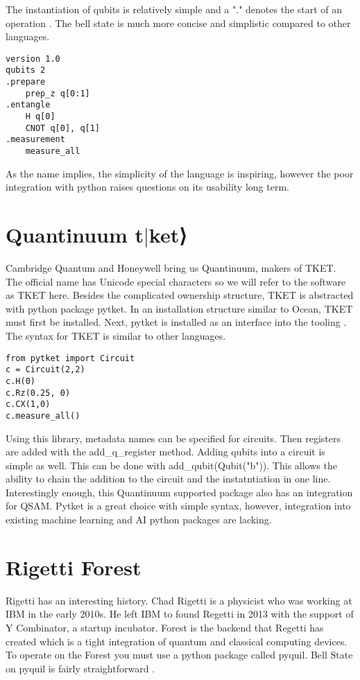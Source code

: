 \documentclass[conference]{IEEEtran}
\begin{document}
The instantiation of qubits is relatively simple and a "." denotes the start of an operation \cite{b12}. 
The bell state is much more concise and simplistic compared to other languages. 
\begin{verbatim}
version 1.0
qubits 2
.prepare
    prep_z q[0:1]
.entangle
    H q[0]
    CNOT q[0], q[1]
.measurement
    measure_all
\end{verbatim}
As the name implies, the simplicity of the language is inspiring, however the poor integration with python raises questions on its usability long term.


\section{Quantinuum t$|$ket⟩}
Cambridge Quantum and Honeywell bring us Quantinuum, makers of TKET. 
The official name has Unicode special characters so we will refer to the software as TKET here.
Besides the complicated ownership structure, TKET is abstracted with python package pytket.
In an installation structure similar to Ocean, TKET must first be installed. 
Next, pytket is installed as an interface into the tooling \cite{b11}.
The syntax for TKET is similar to other languages.
\begin{verbatim}
from pytket import Circuit
c = Circuit(2,2)
c.H(0)
c.Rz(0.25, 0)
c.CX(1,0)
c.measure_all()
\end{verbatim}
Using this library, metadata names can be specified for circuits.
Then registers are added with the add\_q\_register method.
Adding qubits into a circuit is simple as well. 
This can be done with add\_qubit(Qubit("b")).
This allows the ability to chain the addition to the circuit and the instatntiation in one line. 
Interestingly enough, this Quantinuum supported package also has an integration for QSAM.
Pytket is a great choice with simple syntax, however, integration into existing machine learning and AI python packages are lacking.



\section{Rigetti Forest}
Rigetti has an interesting history. 
Chad Rigetti is a physicist who was working at IBM in the early 2010s. 
He left IBM to found Regetti in 2013 with the support of Y Combinator, a startup incubator.
Forest is the backend that Regetti has created which is a tight integration of quantum and classical computing devices.
To operate on the Forest you must use a python package called pyquil. 
Bell State on pyquil is fairly straightforward \cite{b14}.
\end{document}
